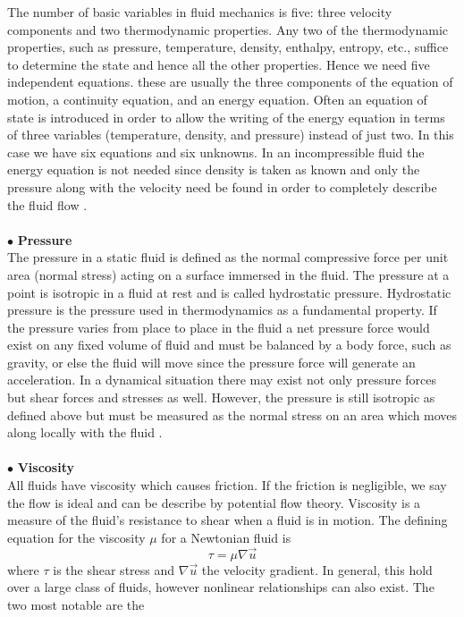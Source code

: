 The number of basic variables in fluid mechanics is five: three velocity
components and two thermodynamic properties.  Any two of the thermodynamic
properties, such as pressure, temperature, density, enthalpy, entropy, etc.,
suffice to determine the state and hence all the other properties.  Hence we
need five independent equations.  these are usually the three components 
of the equation of motion, a continuity equation, and an energy equation.
Often an equation of state is introduced in order to allow the writing
of the energy equation in terms of three variables (temperature, density,
and pressure) instead of just two.  In this case we have six equations
and six unknowns.  In an incompressible fluid the energy equation is not
needed since density is taken as known and only the pressure along with the
velocity need be found in order to completely describe the fluid flow \cite{hughes}.
\\\\
\noindent $\bullet$ \textbf{Pressure} \\
The pressure in a static fluid is defined as the normal compressive force per
unit area (normal stress) acting on a surface immersed in the fluid.  The
pressure at a point is isotropic in a fluid at rest and is called 
hydrostatic pressure.  Hydrostatic pressure is the pressure used in 
thermodynamics as a fundamental property.  If the pressure varies from
place to place in the fluid a net pressure force would exist on any 
fixed volume of fluid and must be balanced by a body force, such as 
gravity, or else the fluid will move since the pressure force will
generate an acceleration.  In a dynamical situation there may exist not 
only pressure forces but shear forces and stresses as well.  However, the
pressure is still isotropic as defined above but must be measured as the
normal stress on an area which moves along locally with the fluid 
\cite{hughes}.
\\\\
\noindent $\bullet$ \textbf{Viscosity} \\
All fluids have viscosity which causes friction.  If the friction is 
negligible, we say the flow is ideal and can be describe by potential 
flow theory.  Viscosity is a measure of the fluid's resistance to shear 
when a fluid is in motion.  The defining equation for the viscosity 
$\mu$ for a Newtonian fluid is
\[
  \tau = \mu \nabla {\vec u}
\]
where $\tau$ is the shear stress and $\nabla {\vec u}$ the velocity
gradient.  In general, this hold over a large class of fluids, however
nonlinear relationships can also exist.  The two most notable are the 

